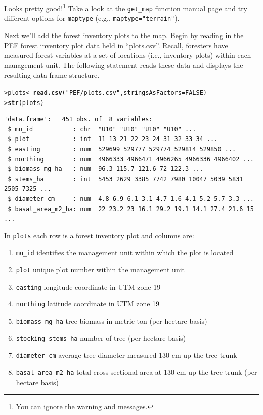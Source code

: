 \documentclass[12pt,oneside]{book}\usepackage[]{graphicx}\usepackage[]{color}
\makeatletter
\newcommand{\hlnum}[1]{\textcolor[rgb]{0.686,0.059,0.569}{#1}}%
\newcommand{\hlstr}[1]{\textcolor[rgb]{0.192,0.494,0.8}{#1}}%
\newcommand{\hlstd}[1]{\textcolor[rgb]{0.345,0.345,0.345}{#1}}%
\newcommand{\hlkwb}[1]{\textcolor[rgb]{0.69,0.353,0.396}{#1}}%
\newcommand{\hlkwc}[1]{\textcolor[rgb]{0.333,0.667,0.333}{#1}}%
\newcommand{\hlkwd}[1]{\textcolor[rgb]{0.737,0.353,0.396}{\textbf{#1}}}%
\newenvironment{kframe}{%
 \def\at@end@of@kframe{}%
 \ifinner\ifhmode%
  \def\at@end@of@kframe{\end{minipage}}%
  \begin{minipage}{\columnwidth}%
 \fi\fi%
 \def\FrameCommand##1{\hskip\@totalleftmargin \hskip-\fboxsep
 \colorbox{shadecolor}{##1}\hskip-\fboxsep
     \hskip-\linewidth \hskip-\@totalleftmargin \hskip\columnwidth}%
 \MakeFramed {\advance\hsize-\width
   \@totalleftmargin\z@ \linewidth\hsize
   \@setminipage}}%
 {\par\unskip\endMakeFramed%
 \at@end@of@kframe}
\newenvironment{knitrout}{}{} %
\makeatother
\begin{document}
Looks pretty good!\footnote{You can ignore the warning and messages.} Take a look at the \verb+get_map+ function manual page and try different options for \verb+maptype+ (e.g., \verb+maptype="terrain"+).

Next we'll add the forest inventory plots to the map. Begin by reading in the PEF forest inventory plot data held in ``plots.csv''. Recall, foresters have measured forest variables at a set of locations (i.e., inventory plots) within each management unit. The following statement reads these data and displays the resulting data frame structure. 
\begin{knitrout}
\color{fgcolor}\begin{kframe}
\begin{alltt}
\hlstd{> }\hlstd{plots} \hlkwb{<-} \hlkwd{read.csv}\hlstd{(}\hlstr{"PEF/plots.csv"}\hlstd{,} \hlkwc{stringsAsFactors} \hlstd{=} \hlnum{FALSE}\hlstd{)}
\hlstd{> }\hlkwd{str}\hlstd{(plots)}
\end{alltt}
\begin{verbatim}
'data.frame':	451 obs. of  8 variables:
 $ mu_id           : chr  "U10" "U10" "U10" "U10" ...
 $ plot            : int  11 13 21 22 23 24 31 32 33 34 ...
 $ easting         : num  529699 529777 529774 529814 529850 ...
 $ northing        : num  4966333 4966471 4966265 4966336 4966402 ...
 $ biomass_mg_ha   : num  96.3 115.7 121.6 72 122.3 ...
 $ stems_ha        : int  5453 2629 3385 7742 7980 10047 5039 5831 2505 7325 ...
 $ diameter_cm     : num  4.8 6.9 6.1 3.1 4.7 1.6 4.1 5.2 5.7 3.3 ...
 $ basal_area_m2_ha: num  22 23.2 23 16.1 29.2 19.1 14.1 27.4 21.6 15 ...
\end{verbatim}
\end{kframe}
\end{knitrout}

In \verb+plots+ each row is a forest inventory plot and columns are:
\begin{enumerate}
  \item \verb+mu_id+ identifies the management unit within which the plot is located
  \item \verb+plot+ unique plot number within the management unit
  \item \verb+easting+ longitude coordinate in UTM zone 19
  \item \verb+northing+ latitude coordinate in UTM zone 19
  \item \verb+biomass_mg_ha+ tree biomass in metric ton (per hectare basis)
  \item \verb+stocking_stems_ha+ number of tree (per hectare basis)
  \item \verb+diameter_cm+ average tree diameter measured 130 cm up the tree trunk
  \item \verb+basal_area_m2_ha+ total cross-sectional area at 130 cm up the tree trunk (per hectare basis)
\end{enumerate}
\end{document}
